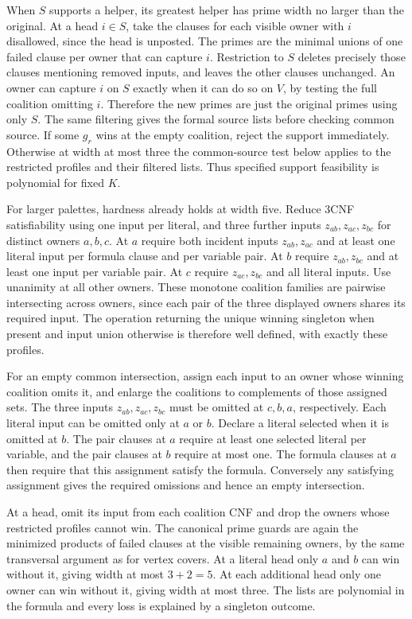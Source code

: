 When $S$ supports a helper, its greatest helper has prime
width no larger than the original. At a head $i\in S$, take
the clauses for each visible owner with $i$ disallowed, since
the head is unposted. The primes are the minimal unions of
one failed clause per owner that can capture $i$. Restriction
to $S$ deletes precisely those clauses mentioning removed
inputs, and leaves the other clauses unchanged. An owner
can capture $i$ on $S$ exactly when it can do so on $V$,
by testing the full coalition omitting $i$. Therefore the
new primes are just the original primes using only $S$.
The same filtering gives the formal source lists before
checking common source. If some $g_r$ wins at the empty
coalition, reject the support immediately. Otherwise at
width at most three the common-source test below applies
to the restricted profiles and their filtered lists. Thus
specified support feasibility is polynomial for fixed $K$.

For larger palettes, hardness already holds at width five.
Reduce 3CNF satisfiability using one input per literal, and
three further inputs $z_{ab},z_{ac},z_{bc}$ for distinct owners
$a,b,c$. At $a$ require both incident inputs $z_{ab},z_{ac}$
and at least one literal input per formula clause and per
variable pair. At $b$ require $z_{ab},z_{bc}$ and at least
one input per variable pair. At $c$ require $z_{ac},z_{bc}$
and all literal inputs. Use unanimity at all other owners.
These monotone coalition families are pairwise intersecting
across owners, since each pair of the three displayed owners
shares its required input. The operation returning the unique
winning singleton when present and input union otherwise is
therefore well defined, with exactly these profiles.

For an empty common intersection, assign each input to an
owner whose winning coalition omits it, and enlarge the
coalitions to complements of those assigned sets. The three
inputs $z_{ab},z_{ac},z_{bc}$ must be omitted at $c,b,a$,
respectively. Each literal input can be omitted only at $a$
or $b$. Declare a literal selected when it is omitted at $b$.
The pair clauses at $a$ require at least one selected literal
per variable, and the pair clauses at $b$ require at most one.
The formula clauses at $a$ then require that this assignment
satisfy the formula. Conversely any satisfying assignment
gives the required omissions and hence an empty intersection.

At a head, omit its input from each coalition CNF and drop
the owners whose restricted profiles cannot win. The canonical
prime guards are again the minimized products of failed clauses
at the visible remaining owners, by the same transversal
argument as for vertex covers. At a literal head only $a$
and $b$ can win without it, giving width at most $3+2=5$.
At each additional head only one owner can win without it,
giving width at most three. The lists are polynomial in the
formula and every loss is explained by a singleton outcome.

